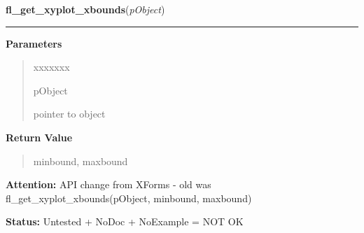     \label{xformslib:library:fl_get_xyplot_xbounds}

    \vspace{0.5ex}

\hspace{.8\funcindent}\begin{boxedminipage}{\funcwidth}

    \raggedright \textbf{fl\_get\_xyplot\_xbounds}(\textit{pObject})

    \vspace{-1.5ex}

    \rule{\textwidth}{0.5\fboxrule}
\setlength{\parskip}{2ex}
\setlength{\parskip}{1ex}
      \textbf{Parameters}
      \vspace{-1ex}

      \begin{quote}
        \begin{Ventry}{xxxxxxx}

          \item[pObject]

          pointer to object

        \end{Ventry}

      \end{quote}

      \textbf{Return Value}
    \vspace{-1ex}

      \begin{quote}
      minbound, maxbound

      \end{quote}

\textbf{Attention:} API change from XForms - old was fl\_get\_xyplot\_xbounds(pObject, 
minbound, maxbound)



\textbf{Status:} Untested + NoDoc + NoExample = NOT OK



    \end{boxedminipage}

    \label{xformslib:library:fl_get_xyplot_ybounds}

    \vspace{0.5ex}

